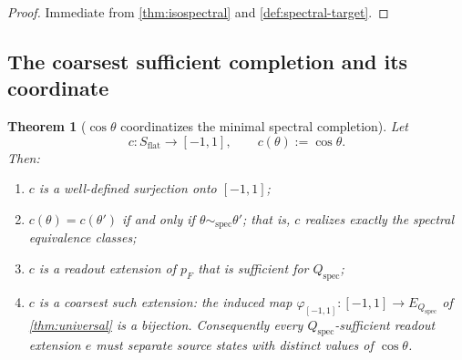 \documentclass[11pt,reqno]{amsart}
\theoremstyle{plain}
\newtheorem{theorem}{Theorem}[section]
\theoremstyle{definition}
\newcommand{\Src}{S}
\begin{document}
\begin{proof}
Immediate from \cref{thm:isospectral} and \cref{def:spectral-target}.
\end{proof}

\subsection{The coarsest sufficient completion and its coordinate}

\begin{theorem}[$\cos\theta$ coordinatizes the minimal spectral
completion]\label{thm:cos-minimal}
Let
\begin{equation}\label{eq:c}
c\colon\Src_{\mathrm{flat}}\longrightarrow[-1,1],
\qquad
c(\theta):=\cos\theta .
\end{equation}
Then:
\begin{enumerate}
\item\label{it:c-welldef} $c$ is a well-defined surjection onto $[-1,1]$;
\item\label{it:c-classes} $c(\theta)=c(\theta')$ if and only if
$\theta\sim_{\mathrm{spec}}\theta'$; that is, $c$ realizes exactly the spectral equivalence
classes;
\item\label{it:c-suff} $c$ is a readout extension of $p_F$ that is sufficient for
$Q_{\mathrm{spec}}$;
\item\label{it:c-min} $c$ is a coarsest such extension: the induced map
$\varphi_{[-1,1]}\colon[-1,1]\to E_{Q_{\mathrm{spec}}}$ of \cref{thm:universal} is a bijection.
Consequently every $Q_{\mathrm{spec}}$-sufficient readout extension $e$ must separate source
states with distinct values of $\cos\theta$.
\end{enumerate}
\end{theorem}
\end{document}
